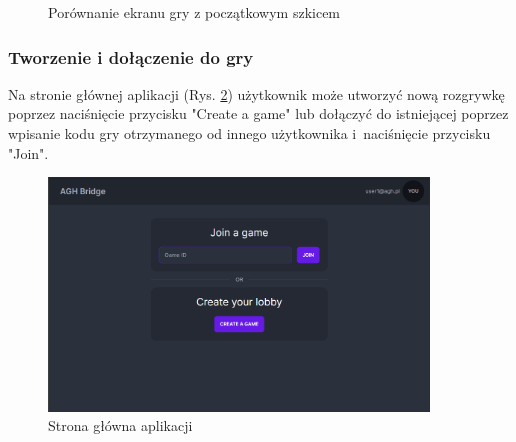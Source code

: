 \begin{figure}[h!]
  \centering
  \hspace*{0.5cm}
  \caption{Porównanie ekranu gry z początkowym szkicem}
  \label{fig:compare_game}
\end{figure}

\FloatBarrier

\subsubsection{Tworzenie i dołączenie do gry}

Na stronie głównej aplikacji (Rys. \ref{fig:home}) użytkownik może utworzyć nową
rozgrywkę poprzez naciśnięcie przycisku "Create a game" lub dołączyć do istniejącej
poprzez wpisanie kodu gry otrzymanego od innego użytkownika i~naciśnięcie
przycisku "Join".

\begin{figure}[h!]
  \centering
  \includegraphics[width=0.9\textwidth]{img/widoki/home.png}
  \caption{Strona główna aplikacji}
  \label{fig:home}
\end{figure}

